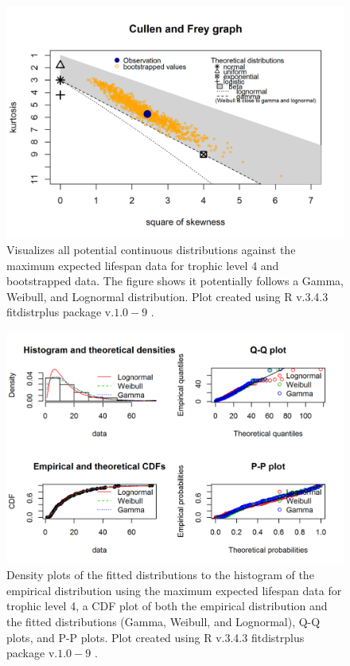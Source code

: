 \documentclass[oneside,12pt,final]{sty/ucthesis-CA2012}
\let\cite\citep                             %
\begin{document}
\begin{mainmatter}
\begin{figure}[H]
     \centering
       \includegraphics[width=.8\textwidth]{fig/cullen_frey_l4}
    \caption{Visualizes all potential continuous distributions against the maximum expected lifespan data for trophic level 4 and bootstrapped data. The figure shows it potentially follows a Gamma, Weibull, and Lognormal distribution. Plot created using R v.3.4.3 \cite{Rcite} fitdistrplus package v.$1.0-9$ \cite{fitdistrplus}. }
    \label{cf_l4_a3}
\end{figure}

\begin{figure}[H]
     \centering
       \includegraphics[width=.8\textwidth]{fig/gof_l4}
    \caption{Density plots of the fitted distributions to the histogram of the empirical distribution using the maximum expected lifespan data for trophic level 4, a CDF plot of both the empirical distribution and the fitted distributions (Gamma, Weibull, and Lognormal), Q-Q plots, and P-P plots. Plot created using R v.3.4.3 \cite{Rcite} fitdistrplus package v.$1.0-9$ \cite{fitdistrplus}. }
    \label{gof_l4_a3}
\end{figure}


\end{mainmatter}
\end{document}
